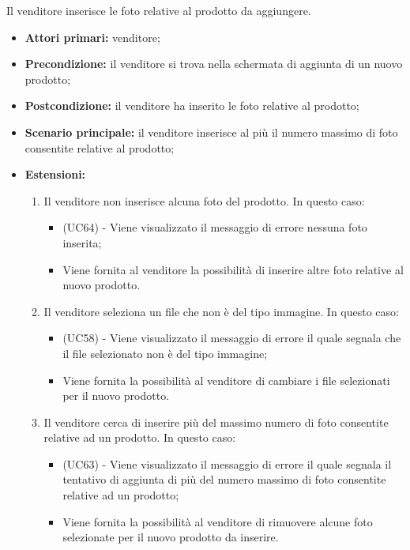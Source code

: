 Il venditore inserisce le foto relative al prodotto da aggiungere.
\begin{itemize}
    \item \textbf{Attori primari:} venditore;
    \item \textbf{Precondizione:} il venditore si trova nella schermata di aggiunta di un nuovo prodotto;
    \item \textbf{Postcondizione:} il venditore ha inserito le foto relative al prodotto;
    \item \textbf{Scenario principale:} il venditore inserisce al più il numero massimo di foto consentite relative al prodotto;
    \item \textbf{Estensioni:}
    \begin{enumerate}[label=\lett]
    	\item Il venditore non inserisce alcuna foto del prodotto. In questo caso:
    	\begin{itemize}
    		\item (UC64) - Viene visualizzato il messaggio di errore nessuna foto inserita;
    		\item Viene fornita al venditore la possibilità di inserire altre foto relative al nuovo prodotto.
    	\end{itemize}
    	\item Il venditore seleziona un file che non è del tipo immagine. In questo caso:
    	\begin{itemize}
    		\item (UC58) - Viene visualizzato il messaggio di errore il quale segnala che il file selezionato non è del tipo immagine;
    		\item Viene fornita la possibilità al venditore di cambiare i file selezionati per il nuovo prodotto.
    	\end{itemize}
    	\item Il venditore cerca di inserire più del massimo numero di foto consentite relative ad un prodotto. In questo caso:
    	\begin{itemize}
    		\item (UC63) - Viene visualizzato il messaggio di errore il quale segnala il tentativo di aggiunta di più del numero massimo di foto consentite relative ad un prodotto;
    		\item Viene fornita la possibilità al venditore di rimuovere alcune foto selezionate per il nuovo prodotto da inserire.
    	\end{itemize}
    \end{enumerate}
\end{itemize}

